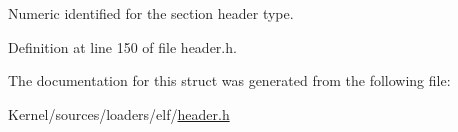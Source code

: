Numeric identified for the section header type. 



Definition at line 150 of file header.h.



The documentation for this struct was generated from the following file:\begin{DoxyCompactItemize}
\item 
Kernel/sources/loaders/elf/\hyperlink{header_8h}{header.h}\end{DoxyCompactItemize}

